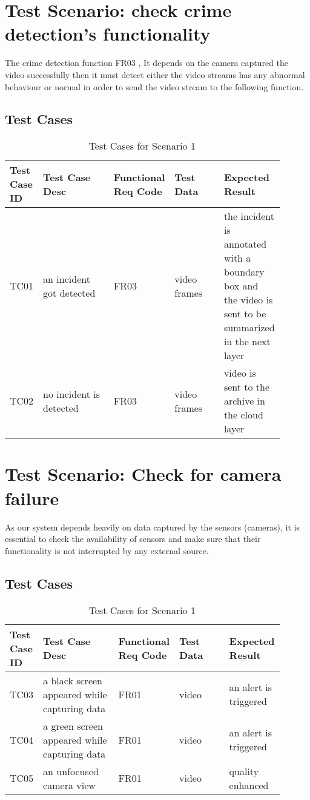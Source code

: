 \documentclass[12pt]{article}
\begin{document}
\section{Test Scenario: check crime detection's functionality}\label{sec:TSx}

The crime detection function FR03 , It depends on the camera captured the video successfully then it must detect either the video streams has any abnormal behaviour or normal in order to send the video stream to the following function.  
\subsection{Test Cases}
\begin{table}[h]
\caption{Test Cases for Scenario 1}
\label{tab:TC1}
\begin{tabular}{|p{0.1\linewidth}|p{0.3\linewidth}|p{0.1\linewidth}|p{0.2\linewidth}|p{0.2\linewidth}|}
\hline
Test Case ID & Test Case Desc & Functional Req Code & Test Data & Expected Result \\ \hline
TC01  & an incident got detected & FR03 &  video frames  & the incident is annotated with a boundary box and the video is sent to be summarized in the next layer           \\ \hline
TC02 & no incident is detected   & FR03    &  video frames     & video is sent to the archive in the cloud layer           \\ \hline

\end{tabular}
\end{table}
\newpage
\section{Test Scenario: Check for camera failure}\label{sec:TSy}
As our system depends heavily on data captured by the sensors (cameras), it is essential to check the availability of sensors and make sure that their functionality is not interrupted by any external source.

\subsection{Test Cases}
\begin{table}[h]
\caption{Test Cases for Scenario 1}
\label{tab:TC1}
\begin{tabular}{|p{0.1\linewidth}|p{0.3\linewidth}|p{0.1\linewidth}|p{0.2\linewidth}|p{0.2\linewidth}|}
\hline
Test Case ID & Test Case Desc & Functional Req Code & Test Data & Expected Result \\ \hline
TC03  & a black screen appeared while capturing data & FR01 &  video   &  an alert is triggered                \\ \hline
TC04 & a green screen appeared while capturing data   & FR01    &  video      &  an alert is triggered           \\ \hline
TC05 & an unfocused camera view  & FR01    &  video      &  quality enhanced          \\ \hline

\end{tabular}
\end{table}
\end{document}
